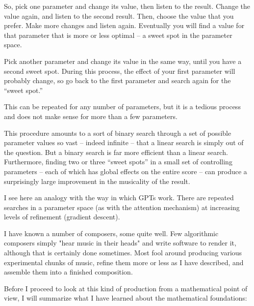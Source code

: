 \documentclass[11pt]{amsart}
\begin{document}
So, pick one parameter and change its value, then listen to the result. Change the value again, and listen to the second result. Then, choose the value that you prefer. Make more changes and listen again. Eventually you will find a value for that parameter that is more or less optimal – a sweet spot in the parameter space.

Pick another parameter and change its value in the same way, until you have a second sweet spot. During this process, the effect of your first parameter will probably change, so go back to the first parameter and search again for the “sweet spot.”

This can be repeated for any number of parameters, but it is a tedious process and does not make sense for more than a few parameters.

This procedure amounts to a sort of binary search through a set of possible parameter values so vast – indeed infinite – that a linear search is simply out of the question. But a binary search is far more efficient than a linear search. Furthermore, finding two or three “sweet spots” in a small set of controlling parameters – each of which has global effects on the entire score – can produce a surprisingly large improvement in the musicality of the result.

I see here an analogy with the way in which GPTs work. There are repeated searches in a parameter space (as with the attention mechanism) at increasing levels of refinement (gradient descent).

I have known a number of composers, some quite well. Few algorithmic composers simply "hear music in their heads" and write software to render it, although that is certainly done sometimes. Most fool around producing various experimental chunks of music, refine them more or less as I have described, and assemble them into a finished composition.

Before I proceed to look at this kind of production from a mathematical point of view, I will summarize what I have learned about the mathematical foundations:
\end{document}
